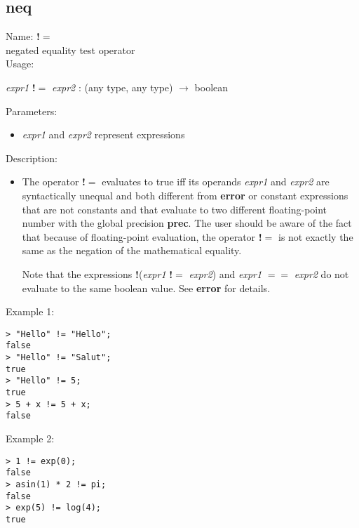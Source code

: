 \subsection{neq}
\label{labneq}
\noindent Name: \textbf{!$=$}\\
negated equality test operator\\

\noindent Usage: 
\begin{center}
\emph{expr1} \textbf{!$=$} \emph{expr2} : (\textsf{any type}, \textsf{any type}) $\rightarrow$ \textsf{boolean}\\
\end{center}
Parameters: 
\begin{itemize}
\item \emph{expr1} and \emph{expr2} represent expressions
\end{itemize}
\noindent Description: \begin{itemize}

\item The operator \textbf{!$=$} evaluates to true iff its operands \emph{expr1} and
   \emph{expr2} are syntactically unequal and both different from \textbf{error} or
   constant expressions that are not constants and that evaluate to two
   different floating-point number with the global precision \textbf{prec}. The
   user should be aware of the fact that because of floating-point
   evaluation, the operator \textbf{!$=$} is not exactly the same as the
   negation of the mathematical equality.
     
   Note that the expressions \textbf{!}(\emph{expr1} \textbf{!$=$} \emph{expr2}) and \emph{expr1}
   \textbf{$==$} \emph{expr2} do not evaluate to the same boolean value. See \textbf{error}
   for details.
\end{itemize}
\noindent Example 1: 
\begin{center}\begin{minipage}{15cm}\begin{Verbatim}[frame=single]
> "Hello" != "Hello";
false
> "Hello" != "Salut";
true
> "Hello" != 5;
true
> 5 + x != 5 + x;
false
\end{Verbatim}
\end{minipage}\end{center}
\noindent Example 2: 
\begin{center}\begin{minipage}{15cm}\begin{Verbatim}[frame=single]
> 1 != exp(0);
false
> asin(1) * 2 != pi;
false
> exp(5) != log(4);
true
\end{Verbatim}
\end{minipage}\end{center}
